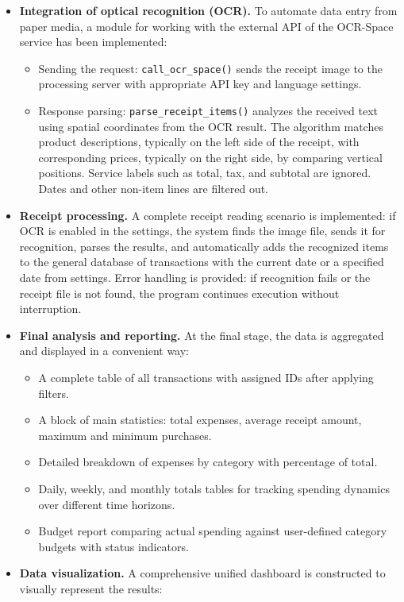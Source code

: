 \documentclass[conference]{IEEEtran}
\begin{document}
\begin{itemize}
\item \textbf{Integration of optical recognition (OCR).} To automate data entry from paper media, a module for working with the external API of the OCR-Space service has been implemented:
\begin{itemize}
\item Sending the request: \texttt{call\_ocr\_space()} sends the receipt image to the processing server with appropriate API key and language settings.
\item Response parsing: \texttt{parse\_receipt\_items()} analyzes the received text using spatial coordinates from the OCR result. The algorithm matches product descriptions, typically on the left side of the receipt, with corresponding prices, typically on the right side, by comparing vertical positions. Service labels such as total, tax, and subtotal are ignored. Dates and other non-item lines are filtered out.
\end{itemize}
\item \textbf{Receipt processing.} A complete receipt reading scenario is implemented: if OCR is enabled in the settings, the system finds the image file, sends it for recognition, parses the results, and automatically adds the recognized items to the general database of transactions with the current date or a specified date from settings. Error handling is provided: if recognition fails or the receipt file is not found, the program continues execution without interruption.
\item \textbf{Final analysis and reporting.} At the final stage, the data is aggregated and displayed in a convenient way:
\begin{itemize}
\item A complete table of all transactions with assigned IDs after applying filters.
\item A block of main statistics: total expenses, average receipt amount, maximum and minimum purchases.
\item Detailed breakdown of expenses by category with percentage of total.
\item Daily, weekly, and monthly totals tables for tracking spending dynamics over different time horizons.
\item Budget report comparing actual spending against user-defined category budgets with status indicators.
\end{itemize}
\item \textbf{Data visualization.} A comprehensive unified dashboard is constructed to visually represent the results:

\end{itemize}
\end{document}
